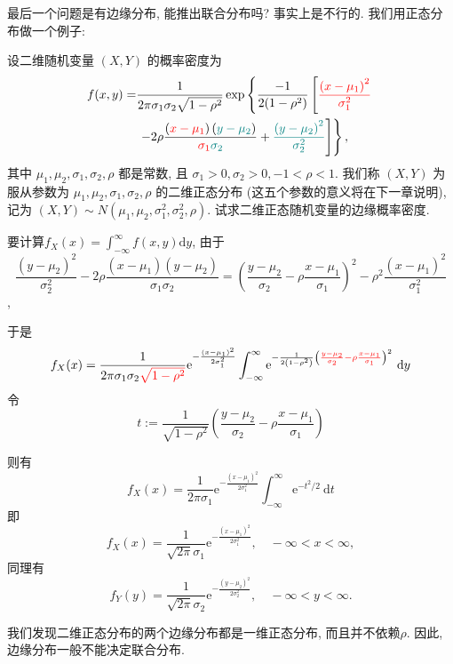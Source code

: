   最后一个问题是有边缘分布, 能推出联合分布吗? 事实上是不行的. 我们用正态分布做一个例子: 

  \begin{example}
    设二维随机变量 $(X, Y)$ 的概率密度为
    $$
        \begin{aligned}
            f(x, y)= &
            \frac{1}{2 \pi \sigma_1 \sigma_2 \sqrt{1-\rho^2}}
            \exp \left\{
            \frac { - 1 } { 2 ( 1 - \rho ^ { 2 } ) }
            \left[{\color{red}\frac{\left(x-\mu_1\right)^2}{\sigma_1^2}}\right.\right. \\
                     & \left.\left.-2 \rho
            \frac{\left({\color{red}x-\mu_1}\right)\left({\color{teal}y-\mu_2}\right)}{{\color{red}\sigma_1} {\color{teal}\sigma_2}}
            +{\color{teal}\frac{\left(y-\mu_2\right)^2}{\sigma_2^2}}\right]\right\},
        \end{aligned}
    $$
    其中 $\mu_1, \mu_2, \sigma_1, \sigma_2, \rho$ 都是常数, 且 $\sigma_1>0, \sigma_2>0,-1<\rho<1$. 我们称 $(X, Y)$ 为服从参数为 $\mu_1, \mu_2, \sigma_1, \sigma_2, \rho$ 的二维正态分布 (这五个参数的意义将在下一章说明), 记为 $(X, Y) \sim N\left(\mu_1, \mu_2, \sigma_1^2, \sigma_2^2, \rho\right)$. 试求二维正态随机变量的边缘概率密度.
\end{example}

\begin{solution}
  要计算$f_X(x)=\int_{-\infty}^{\infty} f(x, y) \mathrm{d} y$, 由于
            $$\frac{\left(y-\mu_2\right)^2}{\sigma_2^2}-2 \rho \frac{\left(x-\mu_1\right)\left(y-\mu_2\right)}{\sigma_1 \sigma_2}=\left(\frac{y-\mu_2}{\sigma_2}-\rho \frac{x-\mu_1}{\sigma_1}\right)^2-\rho^2 \frac{\left(x-\mu_1\right)^2}{\sigma_1^2}$$,

            于是$$f_X(x)=\frac{1}{2 \pi \sigma_1 \sigma_2 {\color{red}\sqrt{1-\rho^2}}} \mathrm{e}^{-\frac{\left(x-\mu_1\right)^2}{2 \sigma_1^2}} \int_{-\infty}^{\infty} \mathrm{e}^{-\frac{1}{2\left(1-\rho^2\right)}\left({\color{red}\frac{y-\mu_2}{\sigma_2}-\rho \frac{x-\mu_1}{\sigma_1}}\right)^2} \mathrm{~d} y$$
        令 $$t:=\frac{1}{\sqrt{1-\rho^2}}\left(\frac{y-\mu_2}{\sigma_2}-\rho \frac{x-\mu_1}{\sigma_1}\right)$$

        则有$$f_X(x)=\frac{1}{2 \pi \sigma_1} \mathrm{e}^{-\frac{\left(x-\mu_1\right)^2}{2 \sigma_1^2}} \int_{-\infty}^{\infty} \mathrm{e}^{-t^2 / 2} \mathrm{~d} t$$
        即 $$f_X(x)=\frac{1}{\sqrt{2 \pi} \sigma_1} \mathrm{e}^{-\frac{\left(x-\mu_1\right)^2}{2 \sigma_1^2}}, \quad-\infty<x<\infty,$$
        同理有
        \small $$f_Y(y)=\frac{1}{\sqrt{2 \pi} \sigma_2} \mathrm{e}^{-\frac{\left(y-\mu_2\right)^2}{2 \sigma_2^2}}, \quad-\infty<y<\infty.$$

        我们发现二维正态分布的两个边缘分布都是一维正态分布, 而且并不依赖$\rho$. 
        因此, 边缘分布一般不能决定联合分布. 
\end{solution}

